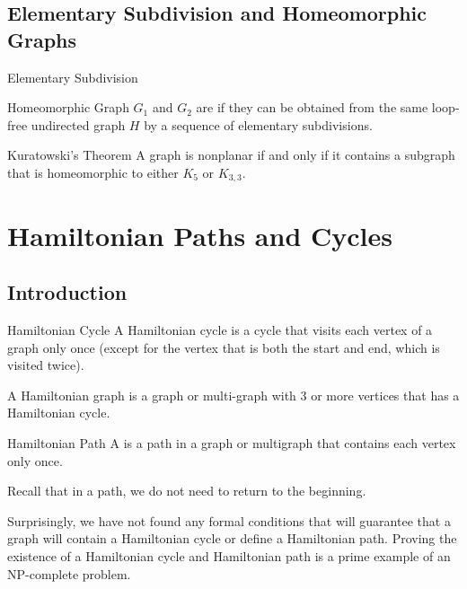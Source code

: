 \documentclass[12pt]{report}
\begin{document}
\section{Elementary Subdivision and Homeomorphic Graphs}

\begin{dfnbox}{Elementary Subdivision}

\end{dfnbox}

\begin{dfnbox}{Homeomorphic Graph}
	$G_1$ and $G_2$ are  if they can be obtained from the same loop-free undirected graph $H$ by a sequence of elementary subdivisions.
\end{dfnbox}

\begin{thmbox}{Kuratowski's Theorem}
	A graph is nonplanar if and only if it contains a subgraph that is homeomorphic to either $K_5$ or $K_{3,3}$.
\end{thmbox}

\chapter{Hamiltonian Paths and Cycles}
\section{Introduction}
\begin{dfnbox}{Hamiltonian Cycle}
	A Hamiltonian cycle is a cycle that visits each vertex of a graph only once (except for the vertex that is both the start and end, which is visited twice).
\end{dfnbox}

A Hamiltonian graph is a graph or multi-graph with 3 or more vertices that has a Hamiltonian cycle.

\begin{dfnbox}{Hamiltonian Path}
	A  is a path in a graph or multigraph that contains each vertex only once.
\end{dfnbox}

Recall that in a path, we do not need to return to the beginning.

Surprisingly, we have not found any formal conditions that will guarantee that a graph will contain a Hamiltonian cycle or define a Hamiltonian path. Proving the existence of a Hamiltonian cycle and Hamiltonian path is a prime example of an NP-complete problem.
\end{document}
